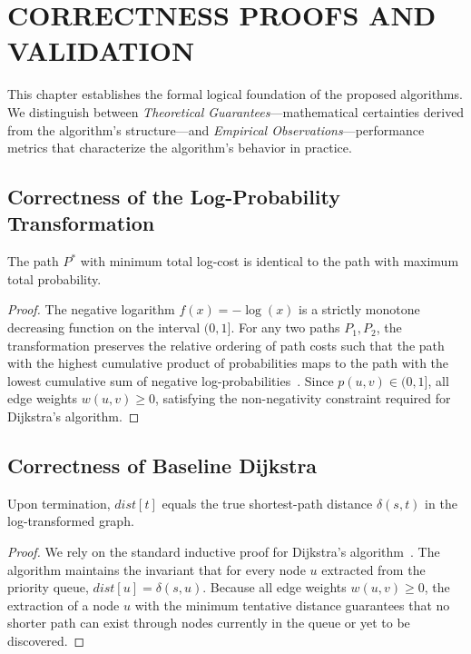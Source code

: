 \chapter{CORRECTNESS PROOFS AND VALIDATION}\label{chap:correctness}

This chapter establishes the formal logical foundation of the proposed algorithms. We distinguish between \textit{Theoretical Guarantees}—mathematical certainties derived from the algorithm's structure—and \textit{Empirical Observations}—performance metrics that characterize the algorithm's behavior in practice.

\section{Correctness of the Log-Probability Transformation}

\begin{theorem}\label{thm:log_transform}
The path $P^*$ with minimum total log-cost is identical to the path with maximum total probability.
\end{theorem}

\begin{proof}
The negative logarithm $f(x)=-\log(x)$ is a strictly monotone decreasing function on the interval $(0,1]$. For any two paths $P_1, P_2$, the transformation preserves the relative ordering of path costs such that the path with the highest cumulative product of probabilities maps to the path with the lowest cumulative sum of negative log-probabilities~\citep{manning1999nlp}. Since $p(u,v) \in (0,1]$, all edge weights $w(u,v) \geq 0$, satisfying the non-negativity constraint required for Dijkstra's algorithm.
\end{proof}

\section{Correctness of Baseline Dijkstra}

\begin{theorem}\label{thm:baseline_optimal}
Upon termination, $\mathit{dist}[t]$ equals the true shortest-path distance $\delta(s,t)$ in the log-transformed graph.
\end{theorem}

\begin{proof}
We rely on the standard inductive proof for Dijkstra’s algorithm~\citep{cormen2009}. The algorithm maintains the invariant that for every node $u$ extracted from the priority queue, $\mathit{dist}[u] = \delta(s,u)$. Because all edge weights $w(u,v) \geq 0$, the extraction of a node $u$ with the minimum tentative distance guarantees that no shorter path can exist through nodes currently in the queue or yet to be discovered. 
\end{proof}

